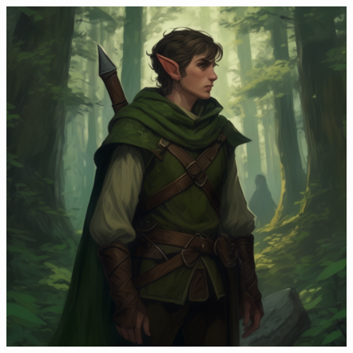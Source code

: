 
\begin{figure}[h]
\begin{center}
\includegraphics[scale=0.24]{img/ai-images/elf.png}
\end{center}
\end{figure}
\label{creature:elf}
